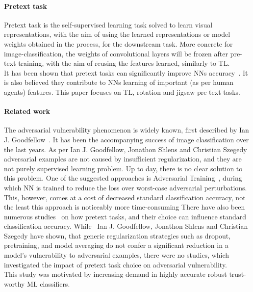 \paragraph{Pretext task}
Pretext task is the self-supervised learning task solved to learn visual representations,
with the aim of using the learned representations or model weights obtained in the process, for the downstream task.
More concrete for image-classification, the weights of convolutional layers will be frozen after pre-text training,
with the aim of reusing the features learned, similarly to TL.
\\
It has been shown that pretext tasks can significantly improve NNs accuracy~\cite{kolesnikov2019revisiting}.
It is also believed they contribute to NNs learning of important (as per human agents) features.
This paper focuses on TL, rotation and jigsaw pre-text tasks.


\paragraph{Related work}
The adversarial vulnerability phenomenon is widely known, first described by Ian J. Goodfellow~\cite{goodfellow2015explaining}.
It has been the accompanying success of image classification over the last years.
As per Ian J. Goodfellow, Jonathon Shlens and Christian Szegedy~\cite{goodfellow2015explaining}
adversarial examples are not caused by insufficient regularization, and they are not purely supervised learning problem.
Up to day, there is no clear solution to this problem.
One of the suggested approaches is Adversarial Training~\cite{https://doi.org/10.48550/arxiv.1805.12152},
during which NN is trained to reduce the loss over worst-case adversarial perturbations.
This, however, comes at a cost of decreased standard classification accuracy, not the least this approach is noticeably more time-consuming
There have also been numerous studies~\cite{kolesnikov2019revisiting,DBLP:journals/corr/NorooziF16,DBLP:journals/corr/abs-1912-01991}
on how pretext tasks, and their choice can influence standard classification accuracy.
While~\cite{goodfellow2015explaining} Ian J. Goodfellow, Jonathon Shlens and Christian Szegedy have shown, that
generic regularization strategies such as dropout, pretraining, and model averaging do
not confer a significant reduction in a model’s vulnerability to adversarial examples,
there were no studies, which investigated the impact of pretext task choice on
adversarial vulnerability. \\
This study was motivated by increasing demand in highly accurate robust trust-worthy ML classifiers.




